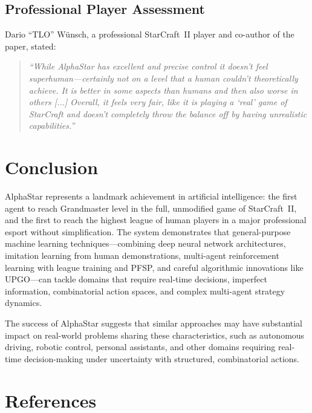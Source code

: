 \documentclass[11pt,a4paper]{article}
\begin{document}
\subsection{Professional Player Assessment}

Dario ``TLO'' W\"unsch, a professional StarCraft~II player and co-author of the paper, stated:

\begin{quote}
\textit{``While AlphaStar has excellent and precise control it doesn't feel superhuman---certainly not on a level that a human couldn't theoretically achieve. It is better in some aspects than humans and then also worse in others [...] Overall, it feels very fair, like it is playing a `real' game of StarCraft and doesn't completely throw the balance off by having unrealistic capabilities.''}
\end{quote}

\section{Conclusion}

AlphaStar represents a landmark achievement in artificial intelligence: the first agent to reach Grandmaster level in the full, unmodified game of StarCraft~II, and the first to reach the highest league of human players in a major professional esport without simplification. The system demonstrates that general-purpose machine learning techniques---combining deep neural network architectures, imitation learning from human demonstrations, multi-agent reinforcement learning with league training and PFSP, and careful algorithmic innovations like UPGO---can tackle domains that require real-time decisions, imperfect information, combinatorial action spaces, and complex multi-agent strategy dynamics.

The success of AlphaStar suggests that similar approaches may have substantial impact on real-world problems sharing these characteristics, such as autonomous driving, robotic control, personal assistants, and other domains requiring real-time decision-making under uncertainty with structured, combinatorial actions.

\section*{References}
\end{document}
